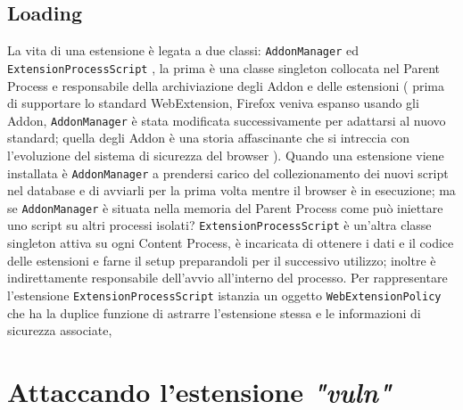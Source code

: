 \documentclass[]{./sapthesis/sapthesis}
\newcommand{\code}[1]{\texttt{#1}}
\newcommand{\vuln}{\textit{"vuln"}}
\newcommand{\AddonManager}{\code{AddonManager} }
\newcommand{\ExtensionProcessScript}{\code{ExtensionProcessScript} }
\newcommand{\WebExtensionPolicy}{\code{WebExtensionPolicy} }
\begin{document}
    \section{ Loading }
        La vita di una estensione è legata a due classi: \AddonManager ed \ExtensionProcessScript,
        la prima è una classe singleton collocata nel Parent Process e responsabile della archiviazione
        degli Addon e delle estensioni ( prima di supportare lo standard WebExtension, Firefox veniva espanso
        usando gli Addon, \AddonManager è stata modificata successivamente per adattarsi al nuovo standard; quella degli
        Addon è una storia affascinante che si intreccia con l'evoluzione del sistema di sicurezza del browser ).
        Quando una estensione viene installata è \AddonManager a prendersi carico del collezionamento dei nuovi
        script nel database e di avviarli per la prima volta mentre il browser è in esecuzione; ma se \AddonManager
        è situata nella memoria del Parent Process come può iniettare uno script su altri processi isolati?
        \ExtensionProcessScript è un'altra classe singleton attiva su ogni Content Process, è incaricata di
        ottenere i dati e il codice delle estensioni e farne il setup preparandoli per il successivo utilizzo;
        inoltre è indirettamente responsabile dell'avvio all'interno del processo. Per rappresentare l'estensione
        \ExtensionProcessScript istanzia un oggetto \WebExtensionPolicy che ha la duplice funzione di astrarre
        l'estensione stessa e le informazioni di sicurezza associate, 
         

\newpage

\chapter{Attaccando l'estensione \vuln}
\end{document}
